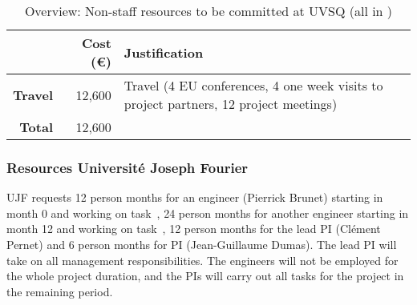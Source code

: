 \bigskip
\begin{table}[H]
\begin{tabular}{|r|r|p{9cm}|}
\hline
\textbf{} & \textbf{Cost (\euro)} & \textbf{Justification} \\\hline
\textbf{Travel} & 12,600 & Travel (4 EU conferences, 4 one week visits to project partners, 12 project meetings)\\\hline
\textbf{Total} & 12,600\\\cline{1-2}
\end{tabular}
\caption{Overview: Non-staff resources to be committed at UVSQ (all in \texteuro)}\vspace*{-1em}
\end{table}





\subsubsection{Resources Universit\'{e} Joseph Fourier}

UJF requests 12 person months for an engineer (Pierrick Brunet) starting in
month 0 and working on task~, 24 person
months for another engineer starting in month 12 and working on task~, 12 person months for the lead PI
(Clément Pernet) and 6 person months for PI (Jean-Guillaume Dumas). 
The lead PI will take on all management responsibilities. The
engineers will not be employed for the whole project duration, and
the PIs will carry out all tasks for the project in the remaining
period.

